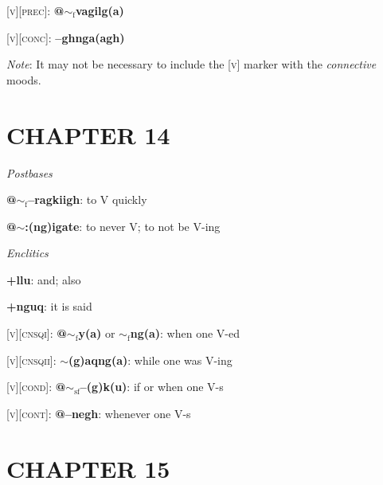 \documentclass{article}
\begin{document}
\bigskip

\textsc{[v][prec]}: \textbf{@$\sim_\text{f}$vagilg(a)}

\bigskip

\textsc{[v][conc]}: \textbf{--ghnga(agh)}

\textit{Note}: It may not be necessary to include the \textsc{[v]} marker with the \textit{connective} moods.


\section*{CHAPTER 14}

\textit{Postbases}
\begin{description}
\item \textbf{@$\sim_\text{f}$--ragkiigh}: to V quickly
\item \textbf{@$\sim$:(ng)igate}: to never V; to not be V-ing
\end{description}

\bigskip

\textit{Enclitics}
\begin{description}
\item \textbf{+llu}: and; also
\item \textbf{+nguq}: it is said
\end{description}

\bigskip

\textsc{[v][cnsqi]}: \textbf{@$\sim_\text{f}$y(a)} or \textbf{$\sim_\text{f}$ng(a)}: when one V-ed

\textsc{[v][cnsqii]}: \textbf{$\sim$(g)aqng(a)}: while one was V-ing

\bigskip

\textsc{[v][cond]}: \textbf{@$\sim_\text{sf}$--(g)k(u)}: if or when one V-s

\bigskip

\textsc{[v][cont]}: \textbf{@--negh}: whenever one V-s


\section*{CHAPTER 15}
\end{document}
